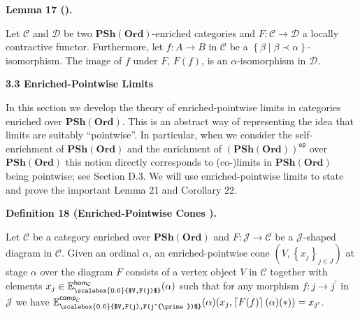  
\par\medskip\noindent\textbf{Lemma 17 ().}\par
 
 
Let $\mathcal{C}$ and $\mathcal{D}$ be two $\mathbf{PSh}(\mathbf{Ord})$-enriched categories and $F:\mathcal{C}\to\mathcal{D}$ a locally contractive functor. Furthermore, let $f:A\to B$ in $\mathcal{C}$ be a $\left\{\beta\middle|\beta\prec\alpha\right\}$-isomorphism. The image of $f$ under $F$, $F(f)$, is an $\alpha$-isomorphism in $\mathcal{D}$.\par
 
 
 
 
 
\par\medskip\noindent\textbf{3.3 Enriched-Pointwise Limits}\par
 
 
In this section we develop the theory of enriched-pointwise limits in categories enriched over $\mathbf{PSh}(\mathbf{Ord})$. This is an abstract way of representing the idea that limits are suitably “pointwise”. In particular, when we consider the self-enrichment of $\mathbf{PSh}(\mathbf{Ord})$ and the enrichment of ${\left(\mathbf{PSh}(\mathbf{Ord})\right)}^{\mathsf{op}}$ over $\mathbf{PSh}(\mathbf{Ord})$ this notion directly corresponds to (co-)limits in $\mathbf{PSh}(\mathbf{Ord})$ being pointwise; see Section D.3. We will use enriched-pointwise limits to state and prove the important Lemma 21 and Corollary 22.\par
 
 
 
\par\medskip\noindent\textbf{Definition 18 (Enriched-Pointwise Cones ).}\par
 
 
Let $\mathcal{C}$ be a category enriched over $\mathbf{PSh}(\mathbf{Ord})$ and $F:\mathcal{J}\to\mathcal{C}$ be a $\mathcal{J}$-shaped diagram in $\mathcal{C}$. Given an ordinal $\alpha$, an enriched-pointwise cone $(V,\left\{x_{j}\right\}_{j\in J})$ at stage $\alpha$ over the diagram $F$ consists of a vertex object $V$ in $\mathcal{C}$ together with elements $x_{j}\in\mathbb{E}^{\mathsf{hom}_{\mathcal{C}}}_{\scalebox{0.6}{$V,F(j)$}}(\alpha)$ such that for any morphism $f:j\to j^{\prime}$ in $\mathcal{J}$ we have $\mathbb{E}^{\mathsf{comp}_{\mathcal{C}}}_{\scalebox{0.6}{$V,F(j),F(j^{\prime})$}}(\alpha)(x_{j},\left\lceil{F(f)}\right\rceil(\alpha)(*))=x_{j^{\prime}}$.\par
 
